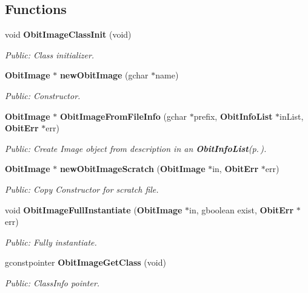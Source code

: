 \subsection*{Functions}
\begin{CompactItemize}
\item 
void {\bf Obit\-Image\-Class\-Init} (void)
\begin{CompactList}\small\item\em Public: Class initializer. \item\end{CompactList}\item 
{\bf Obit\-Image} $\ast$ {\bf new\-Obit\-Image} (gchar $\ast$name)
\begin{CompactList}\small\item\em Public: Constructor. \item\end{CompactList}\item 
{\bf Obit\-Image} $\ast$ {\bf Obit\-Image\-From\-File\-Info} (gchar $\ast$prefix, {\bf Obit\-Info\-List} $\ast$in\-List, {\bf Obit\-Err} $\ast$err)
\begin{CompactList}\small\item\em Public: Create Image object from description in an {\bf Obit\-Info\-List}{\rm (p.\,\pageref{structObitInfoList})}. \item\end{CompactList}\item 
{\bf Obit\-Image} $\ast$ {\bf new\-Obit\-Image\-Scratch} ({\bf Obit\-Image} $\ast$in, {\bf Obit\-Err} $\ast$err)
\begin{CompactList}\small\item\em Public: Copy Constructor for scratch file. \item\end{CompactList}\item 
void {\bf Obit\-Image\-Full\-Instantiate} ({\bf Obit\-Image} $\ast$in, gboolean exist, {\bf Obit\-Err} $\ast$err)
\begin{CompactList}\small\item\em Public: Fully instantiate. \item\end{CompactList}\item 
gconstpointer {\bf Obit\-Image\-Get\-Class} (void)
\begin{CompactList}\small\item\em Public: Class\-Info pointer. \item\end{CompactList}\item 

\end{CompactItemize}
